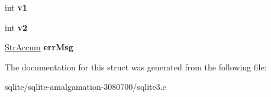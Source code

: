 \begin{DoxyCompactItemize}
\item 
\hypertarget{struct_integrity_ck_a94edb493175bd0c1862efbaeaff63be3}{int {\bfseries v1}}\label{struct_integrity_ck_a94edb493175bd0c1862efbaeaff63be3}

\item 
\hypertarget{struct_integrity_ck_a0dd13b39fb4fd4e42de8ebf05af5c287}{int {\bfseries v2}}\label{struct_integrity_ck_a0dd13b39fb4fd4e42de8ebf05af5c287}

\item 
\hypertarget{struct_integrity_ck_a1e9b79bb1d7b22a840001333200a950e}{\hyperlink{struct_str_accum}{Str\+Accum} {\bfseries err\+Msg}}\label{struct_integrity_ck_a1e9b79bb1d7b22a840001333200a950e}

\end{DoxyCompactItemize}


The documentation for this struct was generated from the following file\+:\begin{DoxyCompactItemize}
\item 
sqlite/sqlite-\/amalgamation-\/3080700/sqlite3.\+c\end{DoxyCompactItemize}
